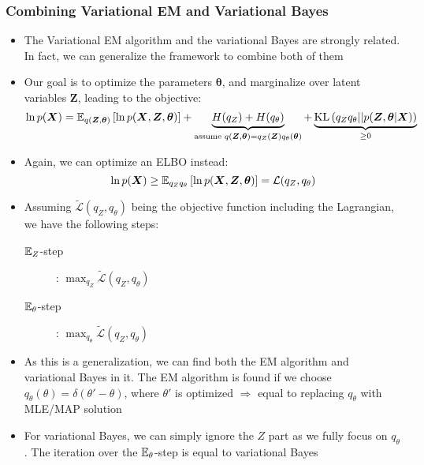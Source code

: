 \subsubsection{Combining Variational EM and Variational Bayes}
\begin{itemize}
	\item The Variational EM algorithm and the variational Bayes are strongly related. In fact, we can generalize the framework to combine both of them
	\item Our goal is to optimize the parameters $\bm{\theta}$, and marginalize over latent variables $\bm{Z}$, leading to the objective:
	$$\ln p(\bm{X}) = \mathbb{E}_{q(\bm{Z}, \bm{\theta})}\left[\ln p(\bm{X}, \bm{Z}, \bm{\theta})\right] + \underbrace{H(q_Z) + H(q_{\theta})}_{\text{assume } q(\bm{Z},\bm{\theta})=q_Z(\bm{Z})q_{\theta}(\bm{\theta})} + \underbrace{\text{KL}\left(q_Z q_{\theta} || p(\bm{Z}, \bm{\theta}|\bm{X})\right)}_{\geq 0}$$
	\item Again, we can optimize an ELBO instead:
	$$\ln p(\bm{X}) \geq \mathbb{E}_{q_Z q_{\theta}}\left[\ln p(\bm{X}, \bm{Z}, \bm{\theta})\right] = \mathcal{L}(q_Z, q_{\theta})$$
	\item Assuming $\tilde{\mathcal{L}}(q_Z, q_{\theta})$ being the objective function including the Lagrangian, we have the following steps:
	\begin{description}
		\item[$\mathbb{E}_{Z}$-step]: $\max_{q_Z} \tilde{\mathcal{L}}(q_Z, q_{\theta})$
		\item[$\mathbb{E}_{\theta}$-step]: $\max_{q_{\theta}} \tilde{\mathcal{L}}(q_Z, q_{\theta})$
	\end{description}
	\item As this is a generalization, we can find both the EM algorithm and variational Bayes in it. The EM algorithm is found if we choose $q_{\theta}(\theta)=\delta(\theta'-\theta)$, where $\theta'$ is optimized $\Rightarrow$ equal to replacing $q_{\theta}$ with MLE/MAP solution
	\item For variational Bayes, we can simply ignore the $Z$ part as we fully focus on $q_{\theta}$. The iteration over the $\mathbb{E}_{\theta}$-step is equal to variational Bayes
\end{itemize}
